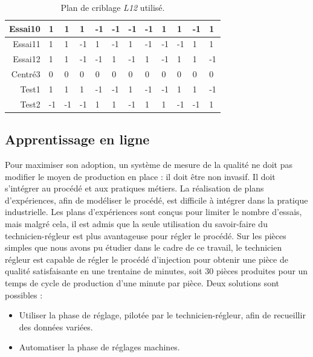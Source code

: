\begin{table}[]
\begin{tabular}{m|m|m|m|m|m|m|m|m|m|m|m|}
        \multicolumn{1}{|r|}{Essai10} & 1      & 1       & 1      & -1     & -1    & -1    & -1    & 1      & 1     & -1     & 1     \\ \hline
        \multicolumn{1}{|r|}{Essai11} & 1      & 1       & -1     & 1      & -1    & 1     & -1    & -1     & -1    & 1      & 1     \\ \hline
        \multicolumn{1}{|r|}{Essai12} & 1      & 1       & -1     & -1     & 1     & -1    & 1     & -1     & 1     & 1      & -1    \\ \hline
        \multicolumn{1}{|r|}{Centré3} & 0      & 0       & 0      & 0      & 0     & 0     & 0     & 0      & 0     & 0      & 0     \\ \hline
        \multicolumn{1}{|r|}{Test1}   & 1      & 1       & 1      & -1     & -1    & 1     & -1    & -1     & 1     & 1      & -1    \\ \hline
        \multicolumn{1}{|r|}{Test2}   & -1     & -1      & -1     & 1      & 1     & -1    & 1     & 1      & -1    & -1     & 1     \\ \hline
    \end{tabular}
    \caption{Plan de criblage \textit{L12} utilisé.}
    \label{tab:doe_screening}
\end{table}

\subsection{Apprentissage en ligne}
Pour maximiser son adoption, un système de mesure de la qualité ne doit pas modifier le moyen de production en place : il doit être non invasif.
Il doit s'intégrer au procédé et aux pratiques métiers. La réalisation de plans d'expériences, afin de modéliser le procédé, est difficile à intégrer dans la pratique industrielle.
Les plans d'expériences sont conçus pour limiter le nombre d'essais, mais malgré cela, il est admis que la seule utilisation du savoir-faire du technicien-régleur est plus avantageuse pour régler le procédé.
Sur les pièces simples que nous avons pu étudier dans le cadre de ce travail, le technicien régleur est capable de régler le procédé d'injection pour obtenir une pièce de qualité satisfaisante en une trentaine de minutes, soit 30 pièces produites pour un temps de cycle de production d'une minute par pièce.
Deux solutions sont possibles :
\begin{itemize}
    \item Utiliser la phase de réglage, pilotée par le technicien-régleur, afin de recueillir des données variées.
    \item Automatiser la phase de réglages machines.
\end{itemize}


